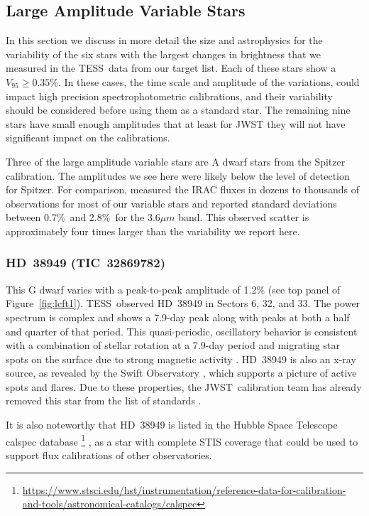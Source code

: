 \documentclass[twocolumn]{aastex631}
\newcommand{\jwst}{JWST}
\newcommand{\tess}{TESS}
\begin{document}
\subsection{Large Amplitude Variable Stars}

In this section we discuss in more detail the size and astrophysics for the variability of the six stars with the largest changes in brightness that we measured in the \tess\ data from our target list. Each of these stars show a $V_{95}\ge0.35$\%. In these cases, the time scale and amplitude of the variations, could impact high precision spectrophotometric calibrations, and their variability should be considered before using them as a standard star. The remaining nine stars have small enough amplitudes that at least for JWST they will not have significant impact on the calibrations. 

Three of the large amplitude variable stars are A dwarf stars from the \citet{Reach2005} Spitzer calibration. The amplitudes we see here were likely below the level of detection for Spitzer. For comparison, \citet{Krick2021IRAC} measured the IRAC fluxes in dozens to thousands of observations for most of our variable stars and reported standard deviations between 0.7\%\ and 2.8\%\ for the 3.6$\mu m$ band.  This observed scatter is approximately four times larger than the variability we report here.


\subsubsection{HD~38949 (TIC~32869782)}

This G dwarf varies with a peak-to-peak amplitude of 1.2\% (see top panel of Figure~\ref{fig:lcft1}). \tess\ observed HD~38949 in Sectors 6, 32, and 33.  The power spectrum is complex and shows a 7.9-day peak along with peaks at both a half and quarter of that period. This quasi-periodic, oscillatory behavior is consistent with a combination of stellar rotation at a 7.9-day period and migrating star spots on the surface due to strong magnetic activity \citep{Santos2021}.  HD~38949 is also an x-ray source, as revealed by the Swift Observatory \citep{Swift2020,Evans2020vizier}, which supports a picture of active spots and flares. Due to these properties, the \jwst\ calibration team has already removed this star from the list of standards \citep{Gordon2022inprep}.

It is also noteworthy that HD~38949 is listed in the Hubble Space Telescope calspec database  \footnote{\url{https://www.stsci.edu/hst/instrumentation/reference-data-for-calibration-and-tools/astronomical-catalogs/calspec}} \citep{Bohlin2014PASP126}, as a star with complete STIS coverage that could be used to support flux calibrations of other observatories.
\end{document}
